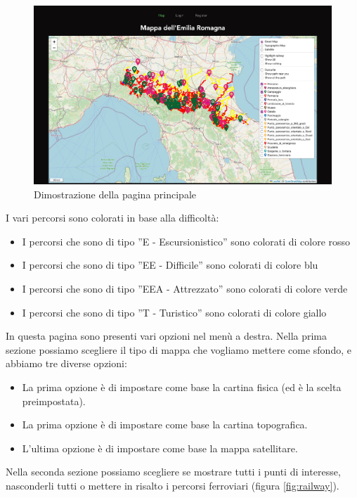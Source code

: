 \begin{figure}[h]
\begin{center}                      
\includegraphics[width=12cm]{images/Schermata_principale.jpg}
\caption[Pagina principale]{Dimostrazione della pagina principale}\label{fig:principale}
\end{center}
\end{figure}

I vari percorsi sono colorati in base alla difficoltà:
\begin{itemize}
    \item I percorsi che sono di tipo ”E - Escursionistico” sono colorati di colore rosso
    \item I percorsi che sono di tipo ”EE - Difficile” sono colorati di colore blu
    \item I percorsi che sono di tipo ”EEA - Attrezzato” sono colorati di colore verde
    \item I percorsi che sono di tipo ”T - Turistico” sono colorati di colore giallo
\end{itemize}

In questa pagina sono presenti vari opzioni nel menù a destra.
Nella prima sezione possiamo scegliere il tipo di mappa che vogliamo mettere come sfondo, e abbiamo tre diverse opzioni:
\begin{itemize}
    \item La prima opzione è di impostare come base la cartina fisica (ed è la scelta preimpostata).
    \item La prima opzione è di impostare come base la cartina topografica.
    \item L'ultima opzione è di impostare come base la mappa satellitare.
\end{itemize}

Nella seconda sezione possiamo scegliere se mostrare tutti i punti di interesse, nasconderli tutti o mettere in risalto i percorsi ferroviari (figura \ref{fig:railway}).

